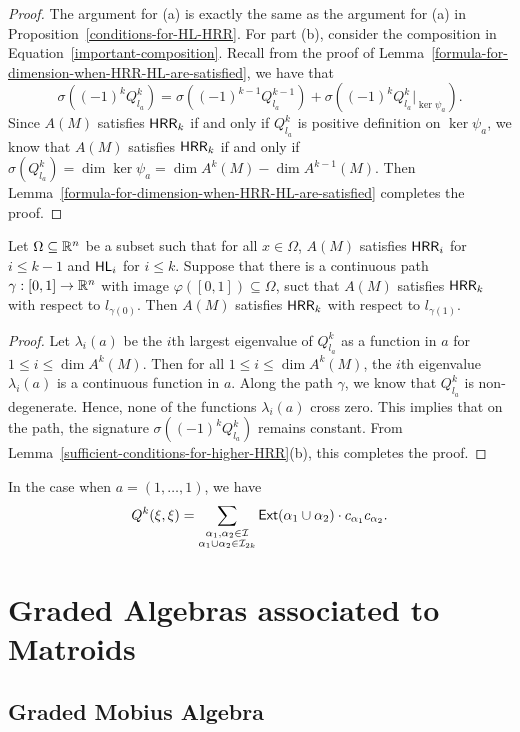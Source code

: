 \documentclass{puthesis-UG}
\begin{document}
\begin{proof}
	The argument for (a) is exactly the same as the argument for (a) in Proposition~\ref{conditions-for-HL-HRR}. For part (b), consider the composition in Equation~\ref{important-composition}. Recall from the proof of Lemma~\ref{formula-for-dimension-when-HRR-HL-are-satisfied}, we have that 
	\[
		\sigma ((-1)^k Q_{l_a}^k) = \sigma \left((-1)^{k-1} Q_{l_a}^{k-1}\right) + \sigma \left((-1)^k Q_{l_a}^k |_{\ker \psi_a}\right).
	\]
	Since $A(M)$ satisfies $\mathsf{HRR}_k$ if and only if $Q_{l_a}^k$ is positive definition on $\ker \psi_a$, we know that $A(M)$ satisfies $\mathsf{HRR}_k$ if and only if $\sigma (Q_{l_a}^k) = \dim \ker \psi_a = \dim A^k(M) - \dim A^{k-1}(M)$. Then Lemma~\ref{formula-for-dimension-when-HRR-HL-are-satisfied} completes the proof.  
\end{proof}

\begin{lem} \label{one-element-is-enough}
	Let $\Omega \subseteq \mathbb{R}^n$ be a subset such that for all $x \in \Omega$, $A(M)$ satisfies $\mathsf{HRR}_i$ for $i \leq k-1$ and $\mathsf{HL}_i$ for $i \leq k$. Suppose that there is a continuous path $\gamma : [0, 1] \to \mathbb{R}^n$ with image $\varphi ([0, 1]) \subseteq \Omega$, suct that $A(M)$ satisfies $\mathsf{HRR}_k$ with respect to $l_{\gamma(0)}$. Then $A(M)$ satisfies $\mathsf{HRR}_k$ with respect to $l_{\gamma(1)}$. 
\end{lem}

\begin{proof}
	Let $\lambda_i(a)$ be the $i$th largest eigenvalue of $Q_{l_a}^k$ as a function in $a$ for $1 \leq i \leq \dim A^k(M)$. Then for all $1 \leq i \leq \dim A^k(M)$, the $i$th eigenvalue $\lambda_i(a)$ is a continuous function in $a$. Along the path $\gamma$, we know that $Q_{l_a}^k$ is non-degenerate. Hence, none of the functions $\lambda_i(a)$ cross zero. This implies that on the path, the signature $\sigma \left((-1)^k Q_{l_a}^k\right)$ remains constant. From Lemma~\ref{sufficient-conditions-for-higher-HRR}(b), this completes the proof.
\end{proof}
In the case when $a = (1, \ldots, 1)$, we have 
\[
	Q^k(\xi, \xi) = \sum_{\substack{\alpha_1, \alpha_2 \in \mathcal{I} \\ \alpha_1 \cup \alpha_2 \in \mathcal{I}_{2k}}} \mathsf{Ext}(\alpha_1 \cup \alpha_2) \cdot c_{\alpha_1} c_{\alpha_2}.
\]
\section{Graded Algebras associated to Matroids}
\subsection{Graded Mobius Algebra}
\end{document}
